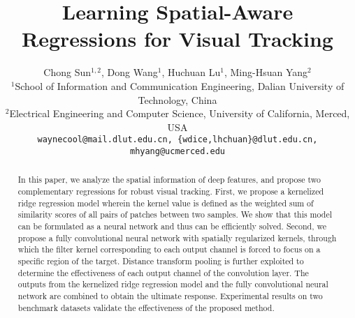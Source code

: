 \documentclass[10pt,twocolumn,letterpaper]{article}
\begin{document}
\title{Learning Spatial-Aware Regressions for Visual Tracking}

\author{Chong Sun$^{1,2}$, Dong Wang$^1$, Huchuan Lu$^1$, Ming-Hsuan Yang$^2$\\
$^1$School of Information and Communication Engineering, Dalian University of Technology, China\\ $^2$Electrical Engineering and Computer Science, University of California, Merced, USA\\
{\tt\small waynecool@mail.dlut.edu.cn, \{wdice,lhchuan\}@dlut.edu.cn,  mhyang@ucmerced.edu}
}

\maketitle
\thispagestyle{empty}

\begin{abstract}
 In this paper, we analyze the spatial information of deep features, and propose two complementary
 regressions for robust visual tracking.
First, we propose a kernelized ridge regression model wherein the kernel value is defined as the
 weighted sum of similarity scores of all pairs of patches between two samples.
We show that this model can be formulated as a neural network and thus can be efficiently solved.
Second, we propose a fully convolutional neural network with spatially regularized kernels, through
which the filter kernel corresponding to each output channel is forced to focus on a specific region of the target.
Distance transform pooling is further exploited to determine the effectiveness
of each output channel of the convolution layer.
The outputs from the kernelized ridge regression model and the fully convolutional neural network
are combined to obtain the ultimate response.
Experimental results on two benchmark datasets validate the effectiveness of the proposed method.

\end{abstract}
\end{document}
